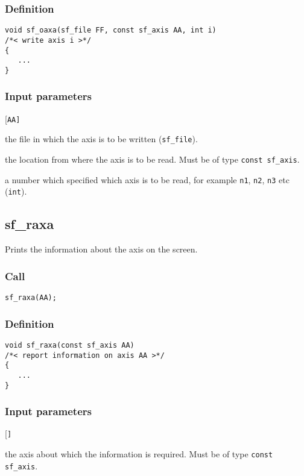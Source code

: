 \subsubsection*{Definition}
\begin{verbatim}
void sf_oaxa(sf_file FF, const sf_axis AA, int i) 
/*< write axis i >*/
{
   ...
}
\end{verbatim}

\subsubsection{Input parameters}
\begin{desclist}{\tt }{\quad}[\tt AA]
   \setlength\itemsep{0pt}
   \item[FF] the file in which the axis is to be written (\texttt{sf\_file}).  
   \item[AA] the location from where the axis is to be read. Must be of type \texttt{const sf\_axis}.  
   \item[i]  a number which specified which axis is to be read, for example \texttt{n1}, \texttt{n2}, \texttt{n3} etc (\texttt{int}).  
\end{desclist}




\subsection{{sf\_raxa}}
Prints the information about the axis on the screen.

\subsubsection*{Call}
\begin{verbatim}sf_raxa(AA);\end{verbatim}

\subsubsection*{Definition}
\begin{verbatim}  
void sf_raxa(const sf_axis AA) 
/*< report information on axis AA >*/
{    
   ...
}
\end{verbatim}

\subsubsection{Input parameters}
\begin{desclist}{\tt }{\quad}[\tt ]
   \setlength\itemsep{0pt}
   \item[AA] the axis about which the information is required. Must be of type \texttt{const sf\_axis}.  
\end{desclist}




